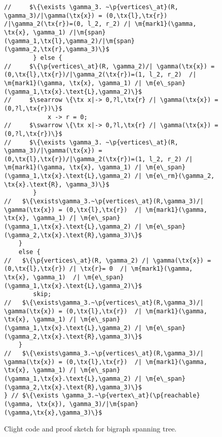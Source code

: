\begin{figure*}
\begin{lstlisting}
//     $\{\exists \gamma_3. ~\p{vertices\_at}(R, \gamma_3)/|\gamma(\tx{x}) = (0,\tx{l},\tx{r}) /|\gamma_2(\tx{r})=(0, l_2, r_2) /| \m{mark1}(\gamma, \tx{x}, \gamma_1) /|\m{span}(\gamma_1,\tx{l},\gamma_2)/|\m{span}(\gamma_2,\tx{r},\gamma_3)\}$
        } else {
//     $\{\p{vertices\_at}(R, \gamma_2)/| \gamma(\tx{x}) = (0,\tx{l},\tx{r})/|\gamma_2(\tx{r})=(1, l_2, r_2)  /| \m{mark1}(\gamma, \tx{x}, \gamma_1) /| \m{e\_span}(\gamma_1,\tx{x}.\text{L},\gamma_2)\}$
//     $\searrow \{\tx x|-> 0,?l,\tx{r} /| \gamma(\tx{x}) = (0,?l,\tx{r})\}$
            x -> r = 0;
//     $\swarrow \{\tx x|-> 0,?l,\tx{r} /| \gamma(\tx{x}) = (0,?l,\tx{r})\}$
//     $\{\exists \gamma_3. ~\p{vertices\_at}(R, \gamma_3)/|\gamma(\tx{x}) = (0,\tx{l},\tx{r})/|\gamma_2(\tx{r})=(1, l_2, r_2) /| \m{mark1}(\gamma, \tx{x}, \gamma_1) /| \m{e\_span}(\gamma_1,\tx{x}.\text{L},\gamma_2) /| \m{e\_rm}(\gamma_2, \tx{x}.\text{R}, \gamma_3)\}$
        }
//   $\{\exists\gamma_3.~\p{vertices\_at}(R,\gamma_3)/| \gamma(\tx{x}) = (0,\tx{l},\tx{r})  /| \m{mark1}(\gamma, \tx{x}, \gamma_1) /| \m{e\_span}(\gamma_1,\tx{x}.\text{L},\gamma_2) /| \m{e\_span}(\gamma_2,\tx{x}.\text{R},\gamma_3)\}$
    }
    else {
//   $\{\p{vertices\_at}(R, \gamma_2) /| \gamma(\tx{x}) = (0,\tx{l},\tx{r}) /| \tx{r}= 0  /| \m{mark1}(\gamma, \tx{x}, \gamma_1)  /| \m{e\_span}(\gamma_1,\tx{x}.\text{L},\gamma_2)\}$
        skip;
//   $\{\exists\gamma_3.~\p{vertices\_at}(R,\gamma_3)/| \gamma(\tx{x}) = (0,\tx{l},\tx{r})  /| \m{mark1}(\gamma, \tx{x}, \gamma_1) /| \m{e\_span}(\gamma_1,\tx{x}.\text{L},\gamma_2) /| \m{e\_span}(\gamma_2,\tx{x}.\text{R},\gamma_3)\}$
    }
//   $\{\exists\gamma_3.~\p{vertices\_at}(R,\gamma_3)/| \gamma(\tx{x}) = (0,\tx{l},\tx{r})  /| \m{mark1}(\gamma, \tx{x}, \gamma_1) /| \m{e\_span}(\gamma_1,\tx{x}.\text{L},\gamma_2) /| \m{e\_span}(\gamma_2,\tx{x}.\text{R},\gamma_3)\}$
} // $\{\exists \gamma_3.~\p{vertex\_at}(\p{reachable}(\gamma, \tx{x}), \gamma_3)/|\m{span}(\gamma,\tx{x},\gamma_3)\}$
\end{lstlisting}

\caption{Clight code and proof sketch for bigraph spanning tree.}
\label{fig:spanning-full}

\end{figure*}